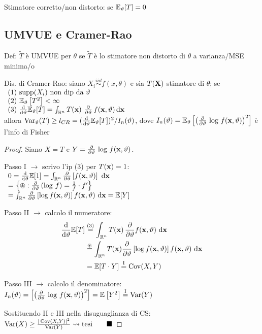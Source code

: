 Stimatore corretto/non distorto: se $\mathbb{E}_\vartheta[T]=0$

\subsection{UMVUE e Cramer-Rao}

Def: $\widetilde{T}$ è UMVUE per $\theta$ se $\widetilde{T}$ è lo stimatore non distorto di $\theta$ a varianza/MSE minima/o 

\smallskip

Dis. di Cramer-Rao: siano $X_i\overset{iid}{\sim} f(x,\theta)$ e sia $T(\mathbf{X})$ stimatore di $\theta$; se \\
$\begin{array}{l}
(1)\ \text{supp}(X_i)\text{ non dip da }\theta \\
(2)\ \EE_\theta\left[T^2\right]<\infty \\
(3)\ \frac{\de}{\de\theta}\EE_\theta[T]=\int_{\RR^n} T(\xv)\ \frac{\partial}{\partial \theta}\,f(\xv,\theta)\,\de\xv
\end{array}$ \\
allora $\text{Var}_\vartheta(T)\geq l_{CR}=(\frac{\mathrm{d}}{\mathrm{d}\vartheta}\mathbb{E}_\vartheta[T])^2/I_n(\vartheta)$, dove $I_n(\vartheta)=\mathbb{E}_\vartheta\left[\left(\frac{\partial}{\partial\vartheta}\,\log\,f(\mathbf{x},\vartheta)\right)^2\right]$ è l'info di Fisher

\begin{proof}
Siano $X=T$ e $Y=\frac{\partial}{\partial\vartheta}\,\log\,f(\mathbf{x},\vartheta)$.

Passo I $\rightarrow$ scrivo l'ip (3) per $T(\mathbf{x})=1$:
$\begin{array}{l}
0=\frac{\mathrm{d}}{\mathrm{d}\vartheta}\mathbb{E}[1]=\int_{\mathbb{R}^n} \frac{\partial}{\partial\vartheta} \left[f(\mathbf{x},\vartheta)\right]\  \mathrm{d} \mathbf{x} \\
=\left\{\circledast:\frac{\partial}{\partial\vartheta}\left(\log\,f\right)=\frac{1}{f}\cdot f'   \right\} \\
=\int_{\mathbb{R}^n} \frac{\partial}{\partial\vartheta} \left[\log f(\mathbf{x},\vartheta)\right] f(\mathbf{x},\vartheta)\  \mathrm{d} \mathbf{x} = \mathbb{E}[Y]
\end{array}$

Passo II $\rightarrow$ calcolo il numeratore:
\begin{align*}
\frac{\mathrm{d}}{\mathrm{d}\vartheta}\mathbb{E}[T]&\overset{(3)}{=}\int_{\mathbb{R}^n}T(\mathbf{x})\,\frac{\partial}{\partial\vartheta}f(\mathbf{x},\vartheta)\  \mathrm{d} \mathbf{x} \\
&\overset{\circledast}{=}\int_{\mathbb{R}^n}T(\mathbf{x}) \frac{\partial}{\partial\vartheta} \left[\log f(\mathbf{x},\vartheta)\right] f(\mathbf{x},\vartheta)\  \mathrm{d} \mathbf{x} \\
&=\mathbb{E}[T\cdot Y]\overset{\text{I}}{=}\operatorname{Cov}(X,Y)
\end{align*}

Passo III $\rightarrow$ calcolo il denominatore: \\
$I_n(\vartheta)=\left[\left(\frac{\partial}{\partial\vartheta}\,\log\,f(\mathbf{x},\vartheta)\right)^2\right]=\mathbb{E}\left[Y^2\right]\overset{\text{I}}{=}\operatorname{Var}(Y)$

Sostituendo II e III nella disuguaglianza di CS: \\
$\operatorname{Var}(X)\geq\frac{|\operatorname{Cov}(X,Y)|^2}{\operatorname{Var}(Y)} \leadsto \text{tesi}\qquad\blacksquare$
\end{proof}

